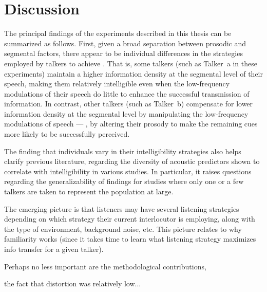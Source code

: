 \chapter{Discussion\label{chap:Discussion}}

The principal findings of the experiments described in this thesis can be summarized as follows.  First, given a broad separation between prosodic and segmental factors, there appear to be individual differences in the strategies employed by talkers to achieve  \citep{Lindblom1990}.  That is, some talkers (such as Talker~\ac{a} in these experiments) maintain a higher information density at the segmental level of their speech, making them relatively intelligible even when the low-frequency modulations of their speech do little to enhance the successful transmission of information.  In contrast, other talkers (such as Talker~\ac{b}) compensate for lower information density at the segmental level by manipulating the low-frequency modulations of speech — \ie, by altering their prosody to make the remaining cues more likely to be successfully perceived.

The finding that individuals vary in their intelligibility strategies also helps clarify previous literature, regarding the diversity of acoustic predictors shown to correlate with intelligibility in various studies.  In particular, it raises questions regarding the generalizability of findings for studies where only one or a few talkers are taken to represent the population at large.     

The emerging picture is that listeners may have several listening strategies depending on which strategy their current interlocutor is employing, along with the type of environment, background noise, etc.  This picture relates to why familiarity works (since it takes time to learn what listening strategy maximizes info transfer for a given talker).

Perhaps no less important are the methodological contributions, 

the fact that distortion was relatively low...



